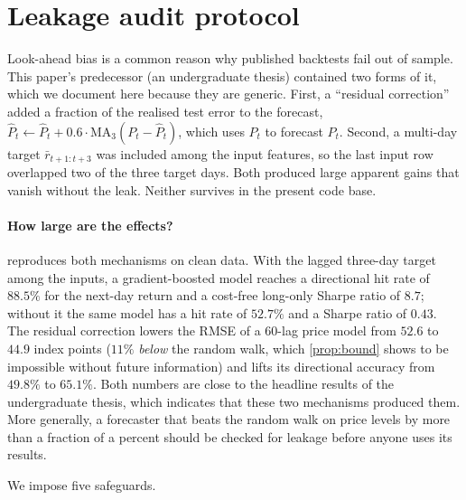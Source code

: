 \section{Leakage audit protocol}\label{app:leakage}

Look-ahead bias is a common reason why published backtests fail out of sample. This paper's predecessor (an
undergraduate thesis) contained two forms of it, which we document here because they are generic.
First, a ``residual correction'' added a fraction of the realised test error to the forecast,
$\hat P_t\leftarrow\hat P_t+0.6\cdot\mathrm{MA}_3(P_t-\hat P_t)$, which uses $P_t$ to forecast $P_t$.
Second, a multi-day target $\bar r_{t+1:t+3}$ was included among the input features, so the last input
row overlapped two of the three target days. Both produced large apparent gains that vanish without
the leak. Neither survives in the present code base.

\paragraph{How large are the effects?}  reproduces both mechanisms on clean data. With
the lagged three-day target among the inputs, a gradient-boosted model reaches a directional hit rate of
$88.5\%$ for the next-day return and a cost-free long-only Sharpe ratio of $8.7$; without it the same
model has a hit rate of $52.7\%$ and a Sharpe ratio of $0.43$. The residual correction lowers the RMSE
of a 60-lag price model from $52.6$ to $44.9$ index points ($11\%$ \emph{below} the random walk,
which \cref{prop:bound} shows to be impossible without future information) and lifts its directional
accuracy from $49.8\%$ to $65.1\%$. Both numbers are close to the headline results of the
undergraduate thesis, which indicates that these two mechanisms produced them. More generally, a
forecaster that beats the random walk on price levels by more than a fraction of a percent should be
checked for leakage before anyone uses its results.



We impose five safeguards.

